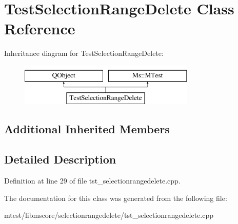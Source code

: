 \hypertarget{class_test_selection_range_delete}{}\section{Test\+Selection\+Range\+Delete Class Reference}
\label{class_test_selection_range_delete}
Inheritance diagram for Test\+Selection\+Range\+Delete\+:\begin{figure}[H]
\begin{center}
\leavevmode
\includegraphics[height=2.000000cm]{class_test_selection_range_delete}
\end{center}
\end{figure}
\subsection*{Additional Inherited Members}


\subsection{Detailed Description}


Definition at line 29 of file tst\+\_\+selectionrangedelete.\+cpp.



The documentation for this class was generated from the following file\+:\begin{DoxyCompactItemize}
\item 
mtest/libmscore/selectionrangedelete/tst\+\_\+selectionrangedelete.\+cpp\end{DoxyCompactItemize}
